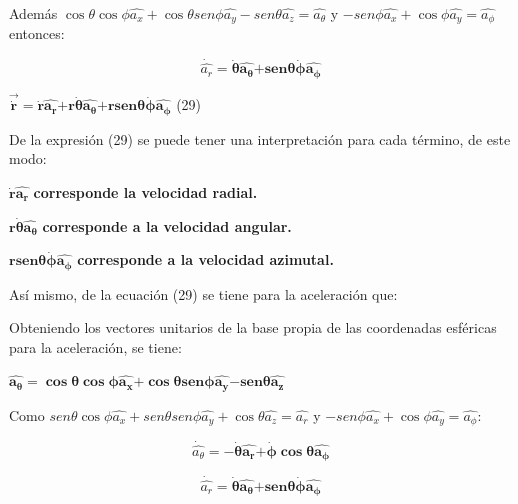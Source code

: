 \documentclass[]{article}
\begin{document}
Además
\(\cos\theta\cos\phi\widehat{a_{x}} + \cos\theta{sen}\phi\widehat{a_{y}} - {sen}\theta\widehat{a_{z}} = \widehat{a_{\theta}}\)
y
\(- {sen}\phi\widehat{a_{x}} + \cos\phi\widehat{a_{y}} = \widehat{a_{\phi}}\)
entonces:

\[\dot{\widehat{a_{r}}} = \dot{\mathbf{\theta}}\widehat{\mathbf{a}_{\mathbf{\theta}}}\mathbf{+}\mathbf{sen}\mathbf{\theta}\dot{\mathbf{\phi}}\widehat{\mathbf{a}_{\mathbf{\phi}}}\]

\(\overrightarrow{\dot{\mathbf{r}}}\mathbf{=}\dot{\mathbf{r}}\widehat{\mathbf{a}_{\mathbf{r}}}\mathbf{+ r}\dot{\mathbf{\theta}}\widehat{\mathbf{a}_{\mathbf{\theta}}}\mathbf{+ r}\mathbf{sen}\mathbf{\theta}\dot{\mathbf{\phi}}\widehat{\mathbf{a}_{\mathbf{\phi}}}\)
(29)

De la expresión (29) se puede tener una interpretación para cada
término, de este modo:

\(\dot{\mathbf{r}}\widehat{\mathbf{a}_{\mathbf{r}}}\)
\textbf{corresponde la velocidad radial.}

\(\mathbf{r}\dot{\mathbf{\theta}}\widehat{\mathbf{a}_{\mathbf{\theta}}}\)
\textbf{corresponde a la velocidad angular.}

\(\mathbf{r}\mathbf{sen}\mathbf{\theta}\dot{\mathbf{\phi}}\widehat{\mathbf{a}_{\mathbf{\phi}}}\)
\textbf{corresponde a la velocidad azimutal.}

Así mismo, de la ecuación (29) se tiene para la aceleración que:

Obteniendo los vectores unitarios de la base propia de las coordenadas
esféricas para la aceleración, se tiene:

\(\widehat{\mathbf{a}_{\mathbf{\theta}}}\mathbf{=}\mathbf{\cos}\mathbf{\theta}\mathbf{\cos}\mathbf{\phi}\widehat{\mathbf{a}_{\mathbf{x}}}\mathbf{+}\mathbf{\cos}\mathbf{\theta}\mathbf{sen}\mathbf{\phi}\widehat{\mathbf{a}_{\mathbf{y}}}\mathbf{-}\mathbf{sen}\mathbf{\theta}\widehat{\mathbf{a}_{\mathbf{z}}}\)

Como
\({sen}{\theta\cos\phi\widehat{a_{x}}} + {sen}{\theta{sen}\phi}\widehat{a_{y}} + \cos\theta\widehat{a_{z}} = \widehat{a_{r}}\)
y
\(- {sen}\phi\widehat{a_{x}} + \cos{\phi\widehat{a_{y}}} = \widehat{a_{\phi}}\):

\[\dot{\widehat{a_{\theta}}}\mathbf{= -}\dot{\mathbf{\theta}}\widehat{\mathbf{a}_{\mathbf{r}}}\mathbf{+}\dot{\mathbf{\phi}}\mathbf{\cos}\mathbf{\theta}\widehat{\mathbf{a}_{\mathbf{\phi}}}\]

\[\dot{\widehat{a_{r}}} = \dot{\mathbf{\theta}}\widehat{\mathbf{a}_{\mathbf{\theta}}}\mathbf{+}\mathbf{sen}\mathbf{\theta}\dot{\mathbf{\phi}}\widehat{\mathbf{a}_{\mathbf{\phi}}}\]
\end{document}
